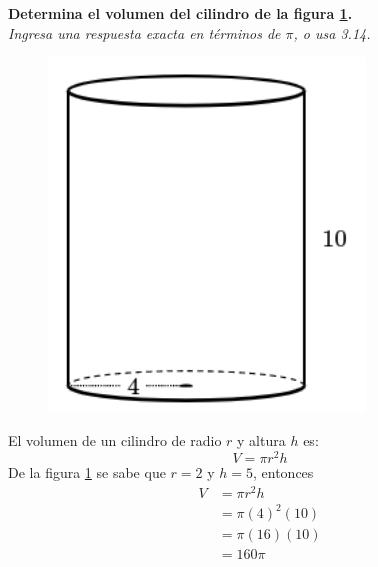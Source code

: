 \question[10] \textbf{Determina el volumen del cilindro de la figura \ref{fig:vol_cil_12}.}\\
\textit{Ingresa una respuesta exacta en términos de $\pi$, o usa 3.14.}

\begin{minipage}{0.3\linewidth}
    \begin{figure}[H]
        \begin{center}
            \includegraphics[width=0.75\textwidth]{../images/vol_cil_12.png}
        \end{center}
        \caption{}
        \label{fig:vol_cil_12}
    \end{figure}
\end{minipage}
\begin{minipage}{0.7\linewidth}
    \begin{solutionbox}{6cm}        El volumen de un cilindro de radio $r$ y altura $h$ es:
        \begin{equation*}
            V = \pi r^2 h
        \end{equation*}
        De la figura \ref{fig:vol_cil_12} se sabe que $r=2$ y $h=5$, entonces
        \begin{equation*}
            \begin{split}
                V & = \pi r^2 h\\
                & = \pi (4)^2 (10)\\
                & = \pi (16) (10)\\
                & = 160\pi
            \end{split}
        \end{equation*}
    \end{solutionbox}
\end{minipage}